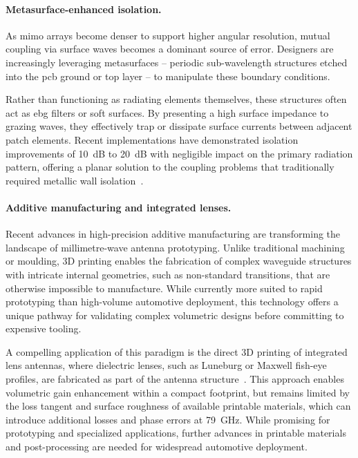 \paragraph{Metasurface-enhanced isolation.}
As \gls{mimo} arrays become denser to support higher angular resolution, mutual coupling via surface waves becomes a dominant source of error.
Designers are increasingly leveraging metasurfaces -- periodic sub-wavelength structures etched into the \gls{pcb} ground or top layer -- to manipulate these boundary conditions.

Rather than functioning as radiating elements themselves, these structures often act as \gls{ebg} filters or soft surfaces.
By presenting a high surface impedance to grazing waves, they effectively trap or dissipate surface currents between adjacent patch elements.
Recent implementations have demonstrated isolation improvements of \qty{10}{dB} to \qty{20}{dB} with negligible impact on the primary radiation pattern, offering a planar solution to the coupling problems that traditionally required metallic wall isolation~\parencite{mohamedPerfectIsolationPerformance2019}.

\paragraph{Additive manufacturing and integrated lenses.}
Recent advances in high-precision additive manufacturing are transforming the landscape of millimetre-wave antenna prototyping.
Unlike traditional machining or moulding, 3D printing enables the fabrication of complex waveguide structures with intricate internal geometries, such as non-standard transitions, that are otherwise impossible to manufacture.
While currently more suited to rapid prototyping than high-volume automotive deployment, this technology offers a unique pathway for validating complex volumetric designs before committing to expensive tooling.

A compelling application of this paradigm is the direct 3D printing of integrated lens antennas, where dielectric lenses, such as Luneburg or Maxwell fish-eye profiles, are fabricated as part of the antenna structure~\parencite{choSeriesFedIntegratedLens2024}.
This approach enables volumetric gain enhancement within a compact footprint, but remains limited by the loss tangent and surface roughness of available printable materials, which can introduce additional losses and phase errors at \qty{79}{GHz}.
While promising for prototyping and specialized applications, further advances in printable materials and post-processing are needed for widespread automotive deployment.


